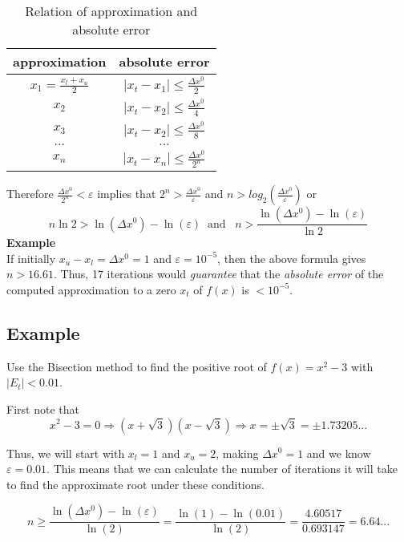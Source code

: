 \documentclass [titlepage,12pt,letter] {article}
\begin{document}
\begin{table}[h]
\begin{center}
\begin{tabular}{c|c}
approximation & absolute error \\
\hline
$x_1 = \frac{x_l+x_u}{2}$ & $|x_t-x_1| \leq \frac{\Delta x^0}{2}$ \\ 
$x_2$                      & $|x_t-x_2| \leq \frac{\Delta x^0}{4}$ \\ 
$x_3$                      & $|x_t-x_2| \leq \frac{\Delta x^0}{8}$ \\ 
$\dots$                    & $\dots$ \\ 
$x_n$                      & $|x_t-x_n| \leq \frac{\Delta x^0}{2^n}$ \\ 

\end{tabular}
\caption{Relation of approximation and absolute error} 
\end{center}
\end{table}

\noindent
Therefore $\frac{\Delta x^0}{2^n} < \varepsilon$ implies that 
$2^n > \frac{\Delta x^0}{\varepsilon}$ and $n > log_2\left( \frac{\Delta x^0}{\varepsilon}{}\right)$ or 
\[
n \ln 2 > \ln{(\Delta x^0)} - \ln(\varepsilon) \;\; \mbox{and} \;\;\; n > \frac{\ln{(\Delta x^0)}-\ln{(\varepsilon)}}{\ln 2}
\] 
\noindent 
{\bf Example} \\ 
If initially $x_u - x_l = \Delta x^0 = 1$ and $\varepsilon = 10^{-5}$, then the above formula gives $n > 16.61$. Thus, 17 iterations would {\em guarantee} that the {\em absolute error} of the computed approximation to a zero $x_t$ of $f(x)$ 
is $ < 10^{-5} $. 

\subsection{Example}
Use the Bisection method to find the positive root of $f(x)=x^2-3$ with $|E_{t}|<0.01$.

\vspace{\baselineskip}
\noindent
First note that
\[
x^2-3=0 \Longrightarrow (x+ \sqrt{3})(x- \sqrt{3}) \Longrightarrow x = \pm \sqrt{3} = \pm 1.73205...
\]

\noindent
Thus, we will start with $x_{l}=1$ and $x_{u}=2$, making $\Delta x^0 = 1$ and we know $\varepsilon = 0.01$. This means that we can calculate the number of iterations it will take to find the approximate root under these conditions.

\[
n \geq \frac{\ln{(\Delta x^0)} - \ln{(\varepsilon)}}{\ln{(2)}} = \frac{\ln{(1)} - \ln{(0.01)}}{\ln{(2)}} = \frac{4.60517}{0.693147} = 6.64...
\]
\end{document}
